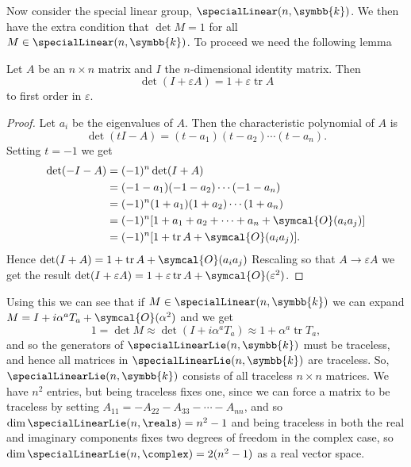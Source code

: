 \documentclass[fleqn]{NotesClass}
\renewcommand{\field}{\symbb{k}}
\newcommand{\order}{\symcal{O}}
\DeclareMathOperator{\tr}{tr}
\begin{document}
    Now consider the special linear group, \(\specialLinear(n, \field)\).
    We then have the extra condition that \(\det M = 1\) for all \(M \in \specialLinear(n, \field)\).
    To proceed we need the following lemma
    \begin{lma}{}{}
        Let \(A\) be an \(n \times n\) matrix and \(I\) the \(n\)-dimensional identity matrix.
        Then
        \begin{equation}
            \det(I + \varepsilon A) = 1 + \varepsilon\tr A
        \end{equation}
        to first order in \(\varepsilon\).
        \begin{proof}
            Let \(a_i\) be the eigenvalues of \(A\).
            Then the characteristic polynomial of \(A\) is
            \begin{equation}
                \det(t I - A) = (t - a_1)(t - a_2) \dotsm (t - a_n).
            \end{equation}
            Setting \(t = -1\) we get
            \begin{align}
                \det(-I - A) &= (-1)^n \det(I + A)\\
                &= (-1 - a_1)(-1 - a_2) \dotsm (-1 - a_n)\\
                &= (-1)^n(1 + a_1)(1 + a_2) \dotsm (1 + a_n)\\
                &= (-1)^n[1 + a_1 + a_2 + \dotsb + a_n + \order(a_ia_j)]\\
                &= (-1)^n[1 + \tr A + \order(a_ia_j)].
            \end{align}
            Hence \(\det(I + A) = 1 + \tr A + \order(a_ia_j)\)
            Rescaling so that \(A \to \varepsilon A\) we get the result \(\det(I + \varepsilon A) = 1 + \varepsilon\tr A + \order(\varepsilon^2)\).
        \end{proof}
    \end{lma}
    Using this we can see that if \(M \in \specialLinear(n, \field)\) we can expand \(M = I + i\alpha^aT_a + \order(\alpha^2)\) and we get
    \begin{equation}
        1 = \det M \approx \det(I + i\alpha^aT_a) \approx 1 + \alpha^a \tr T_a,
    \end{equation}
    and so the generators of \(\specialLinearLie(n, \field)\) must be traceless, and hence all matrices in \(\specialLinearLie(n, \field)\) are traceless.
    So, \(\specialLinearLie(n, \field)\) consists of all traceless \(n \times n\) matrices.
    We have \(n^2\) entries, but being traceless fixes one, since we can force a matrix to be traceless by setting \(A_{11} = -A_{22} - A_{33} - \dotsb - A_{nn}\), and so \(\dim \specialLinearLie(n, \reals) = n^2 - 1\) and being traceless in both the real and imaginary components fixes two degrees of freedom in the complex case, so \(\dim \specialLinearLie(n, \complex) = 2(n^2 - 1)\) as a real vector space.
    
\end{document}
